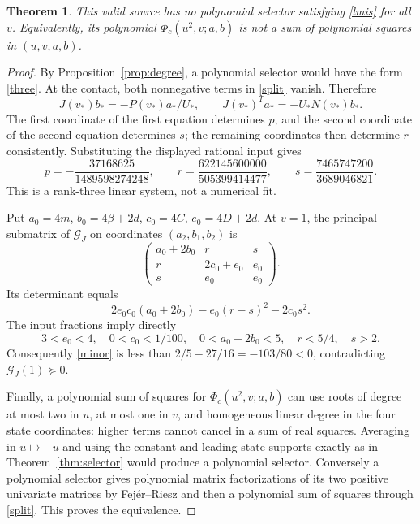 \documentclass[11pt]{article}
\newtheorem{theorem}{Theorem}
\newcommand{\PSD}{\succeq0}
\begin{document}
\begin{theorem}\label{thm:obstruction}
This valid source has no polynomial selector satisfying \eqref{lmis} for all
$v$. Equivalently, its polynomial $\Phi_c(u^2,v;a,b)$ is not a sum of polynomial
squares in $(u,v,a,b)$.
\end{theorem}
\begin{proof}
By Proposition~\ref{prop:degree}, a polynomial selector would have the form
\eqref{three}. At the contact, both nonnegative terms in \eqref{split} vanish.
Therefore
\begin{equation}
J(v_*)b_*=-P(v_*)a_*/U_*,\qquad
J(v_*)^Ta_*=-U_*N(v_*)b_*.\label{kernel}
\end{equation}
The first coordinate of the first equation determines $p$, and the second
coordinate of the second equation determines $s$; the remaining coordinates
then determine $r$ consistently. Substituting the displayed rational input gives
\begin{equation}
p=-\frac{37168625}{1489598274248},\qquad
r=\frac{622145600000}{505399414477},\qquad
s=\frac{7465747200}{3689046821}.\label{forced}
\end{equation}
This is a rank-three linear system, not a numerical fit.

Put $a_0=4m$, $b_0=4\beta+2d$, $c_0=4C$, $e_0=4D+2d$.  At $v=1$, the principal
submatrix of $\mathcal G_J$ on coordinates $(a_2,b_1,b_2)$ is
\[
\begin{pmatrix}
a_0+2b_0&r&s\\r&2c_0+e_0&e_0\\s&e_0&e_0
\end{pmatrix}.
\]
Its determinant equals
\begin{equation}
2e_0c_0(a_0+2b_0)-e_0(r-s)^2-2c_0s^2.\label{minor}
\end{equation}
The input fractions imply directly
\[
3<e_0<4,\quad 0<c_0<1/100,\quad 0<a_0+2b_0<5,\quad
r<5/4,\quad s>2.
\]
Consequently \eqref{minor} is less than
$2/5-27/16=-103/80<0$, contradicting $\mathcal G_J(1)\PSD$.

Finally, a polynomial sum of squares for $\Phi_c(u^2,v;a,b)$ can use roots
of degree at most two in $u$, at most one in $v$, and homogeneous linear
degree in the four state coordinates: higher terms cannot cancel in a sum
of real squares. Averaging in $u\mapsto-u$ and using the constant and leading
state supports exactly as in Theorem~\ref{thm:selector} would produce a
polynomial selector. Conversely a polynomial selector gives polynomial
matrix factorizations of its two positive univariate matrices by
Fej\'er--Riesz and then a polynomial sum of squares through \eqref{split}.
This proves the equivalence.
\end{proof}
\end{document}
